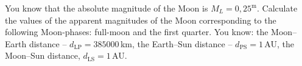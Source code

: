 You know that the absolute magnitude of the Moon is
$M_L = 0{,}25^{\mathrm{m}}$. Calculate the values of the apparent magnitudes of
the Moon corresponding to the following Moon-phases: full-moon and the first
quarter. You know: the Moon--Earth distance --
$d_{\mathrm{LP}} = 385000$\,km, the Earth--Sun distance --
$d_{\mathrm{PS}} = 1$\,AU, the Moon--Sun distance,
$d_{\mathrm{LS}} = 1$\,AU.
